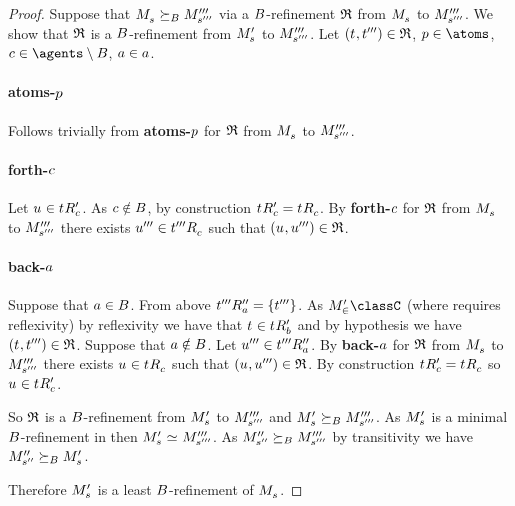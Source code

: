 \begin{proof}
Suppose that $\kPModel{\kStateS} \simulatesBs \kPModelPPP{\kStateSPPP}$ via a $B$-refinement $\mathfrak{R}$ from $\kPModel{\kStateS}$ to ${M^{\prime\prime\prime}_{{s}^{\prime\prime\prime}}}$.
We show that $\mathfrak{R}$ is a $B$-refinement from $\kPModelP{\kStateS}$ to ${M^{\prime\prime\prime}_{{s}^{\prime\prime\prime}}}$.
Let $(\kStateT, \kStateTPPP) \in \refinement$, $\atomP \in \atoms$, $\agentC \in \agents \setminus \agentsB$, $a \in a$.

\paragraph{atoms-$p$}
Follows trivially from {\bf atoms-$p$} for $\mathfrak{R}$ from $\kPModel{\kStateS}$ to ${M^{\prime\prime\prime}_{{s}^{\prime\prime\prime}}}$.

\paragraph{forth-$c$}
Let $\kStateU \in \kSuccessorsPC{\kStateT}$.
As $c \notin B$, by construction $\kSuccessorsPC{\kStateT} = \kSuccessorsC{\kStateT}$.
By {\bf forth-$c$} for $\mathfrak{R}$  from $\kPModel{\kStateS}$ to ${M^{\prime\prime\prime}_{{s}^{\prime\prime\prime}}}$ there exists $\kStateUPPP \in \kSuccessorsC{\kStateTPPP}$ such that $(\kStateU, \kStateUPPP) \in \refinement$.

\paragraph{back-$a$}
Suppose that $a \in B$.
From above ${{t}^{\prime\prime\prime}} {R^{\prime\prime}_{a}} = \{{t}^{\prime\prime\prime}\}$.
As $\kPModelP \in \classC$ (where \classC{} requires reflexivity) by reflexivity we have that $\kStateT \in \kSuccessorsPB{\kStateT}$ and by hypothesis we have $(\kStateT, \kStateTPPP) \in \refinement$.
Suppose that $a \notin B$.
Let ${u}^{\prime\prime\prime} \in {{t}^{\prime\prime\prime}} {R^{\prime\prime}_{a}}$.
By {\bf back-$a$} for $\mathfrak{R}$ from $\kPModel{\kStateS}$ to ${M^{\prime\prime\prime}_{{s}^{\prime\prime\prime}}}$ there exists $\kStateU \in \kSuccessorsC{\kStateT}$ such that $(\kStateU, \kStateUPPP) \in \refinement$.
By construction $\kSuccessorsPC{\kStateT} = \kSuccessorsC{\kStateT}$ so $\kStateU \in \kSuccessorsPC{\kStateT}$.

So $\mathfrak{R}$ is a $B$-refinement from $\kPModelP{\kStateS}$ to ${M^{\prime\prime\prime}_{{s}^{\prime\prime\prime}}}$ and $\kPModelP{\kStateS} \simulatesBs \kPModelPPP{\kStateSPPP}$.
As $\kPModelP{\kStateS}$ is a minimal $B$-refinement in \classC{} then $\kPModelP{\kStateS} \bisimilar \kPModelPPP{\kStateSPPP}$.
As ${M^{\prime\prime}_{{s}^{\prime\prime}}} \succeq_{B} {M^{\prime\prime\prime}_{{s}^{\prime\prime\prime}}}$ by transitivity we have $\kPModelPP{\kStateSPP} \simulatesBs \kPModelP{\kStateS}$.

Therefore $\kPModelP{\kStateS}$ is a least $B$-refinement of $\kPModel{\kStateS}$.
\end{proof}

